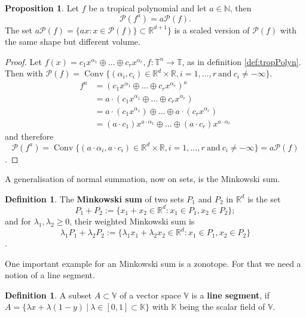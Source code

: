 \documentclass{article}
\theoremstyle{definition}
\newtheorem{definition}[theorem]{Definition}
\newtheorem{proposition}[theorem]{Proposition}
\DeclareMathOperator{\Conv}{Conv}
\begin{document}
\begin{proposition}\hspace{1sp}\cite[p.~4]{zhang2018tropical}
\label{prop:p_exp}
Let $f$ be a tropical polynomial and let $a \in \mathbb{N}$, then
$$ \mathcal{P}(f^{a}) = a \mathcal{P}(f).$$
The set $a \mathcal{P}(f) = \{ax : x \in \mathcal{P}(f) \} \subset \mathbb{R}^{d + 1}\}$ is a scaled version of $\mathcal{P}(f)$ with the same shape but different volume.
\end{proposition}
\begin{proof}
Let $f(x)=c_{1}x^{\alpha_1} \oplus \dots \oplus c_{r}x^{\alpha_r}, f:\mathbb{T}^{n} \to \mathbb{T}$, as in definition \ref{def:tropPolyn}. Then with $\mathcal{P}(f) = \Conv\{(\alpha_{i}, c_{i}) \in \mathbb{R}^{d} \times \mathbb{R}, i= 1, \dots , r \ \text{and} \ c_{i} \neq - \infty \}$.
\begin{align*}
f^{a} &= (c_{1}x^{\alpha_{1}} \oplus \dots \oplus c_{r} x^{\alpha_{r}})^{a} \\
&= a \cdot (c_{1}x^{\alpha_{1}} \oplus \dots \oplus c_{r} x^{\alpha_{r}}) \\
&= a \cdot (c_{1}x^{\alpha_{1}}) \oplus \dots \oplus a \cdot (c_{r} x^{\alpha_{r}}) \\
&= (a \cdot c_{1})x^{a \cdot \alpha_{1}} \oplus \dots \oplus (a \cdot c_{r}) x^{a \cdot \alpha_{r}}
\end{align*}
and therefore
$$\mathcal{P}(f^{a}) = \Conv\{(a \cdot \alpha_{i}, a \cdot c_{i}) \in \mathbb{R}^{d} \times \mathbb{R}, i = 1, \dots, r \ \text{and} \ c_{i} \neq - \infty \} = a\mathcal{P}(f)$$.
\end{proof}

A generalisation of normal summation, now on sets, is the Minkowski sum.

\begin{definition}\hspace{1sp}\cite[p.~4]{zhang2018tropical}
The \textbf{Minkowski sum} of two sets $P_1$ and $P_2$ in $\mathbb{R}^{d}$ is the set
$$ P_1 + P_2 := \{x_1 + x_2 \in \mathbb{R}^{d} : x_1 \in P_1 ,x_2 \in P_2 \};$$
and for $\lambda_1 , \lambda_2 \geq 0$, their weighted Minkowski sum is
$$ \lambda_1 P_1 + \lambda_2 P_2 := \{ \lambda_1 x_1 + \lambda_2 x_2 \in \mathbb{R}^{d} : x_1 \in P_1 , x_2 \in P_2 \} $$.
\end{definition}

One important example for an Minkowski sum is a zonotope. For that we need a notion of a line segment.
\begin{definition}
A subset $A \subset \mathbb{V}$ of a vector space $\mathbb{V}$ is a \textbf{line segment}, if $A=\{\lambda x + \lambda (1-y) \ | \ \lambda \in [0,1]\subset \mathbb{K}\}$ with $\mathbb{K}$ being the scalar field of $\mathbb{V}$.
\end{definition}
\end{document}
